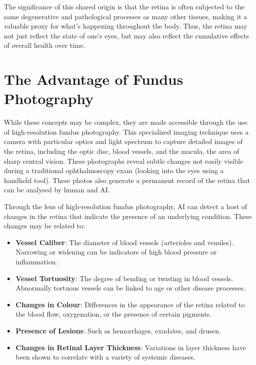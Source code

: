 \documentclass[
  Letterpaper,
]{scrbook}
\begin{document}
The significance of this shared origin is that the retina is often
subjected to the same degenerative and pathological processes as many
other tissues, making it a valuable proxy for what's happening
throughout the body. Thus, the retina may not just reflect the state of
one's eyes, but may also reflect the cumulative effects of overall
health over time.

\section{The Advantage of Fundus
Photography}\label{the-advantage-of-fundus-photography}

While these concepts may be complex, they are made accessible through
the use of high-resolution fundus photography. This specialized imaging
technique uses a camera with particular optics and light spectrum to
capture detailed images of the retina, including the optic disc, blood
vessels, and the macula, the area of sharp central vision. These
photographs reveal subtle changes not easily visible during a
traditional ophthalmoscopy exam (looking into the eyes using a handheld
tool). These photos also generate a permanent record of the retina that
can be analysed by human and AI.

Through the lens of high-resolution fundus photography, AI can detect a
host of changes in the retina that indicate the presence of an
underlying condition. These changes may be related to:

\begin{itemize}
\item
  \textbf{Vessel Caliber}: The diameter of blood vessels (arterioles and
  venules). Narrowing or widening can be indicators of high blood
  pressure or inflammation.
\item
  \textbf{Vessel Tortuosity}: The degree of bending or twisting in blood
  vessels. Abnormally tortuous vessels can be linked to age or other
  disease processes.
\item
  \textbf{Changes in Colour}: Differences in the appearance of the
  retina related to the blood flow, oxygenation, or the presence of
  certain pigments.
\item
  \textbf{Presence of Lesions}: Such as hemorrhages, exudates, and
  drusen.
\item
  \textbf{Changes in Retinal Layer Thickness}: Variations in layer
  thickness have been shown to correlate with a variety of systemic
  diseases.
\end{itemize}
\end{document}
